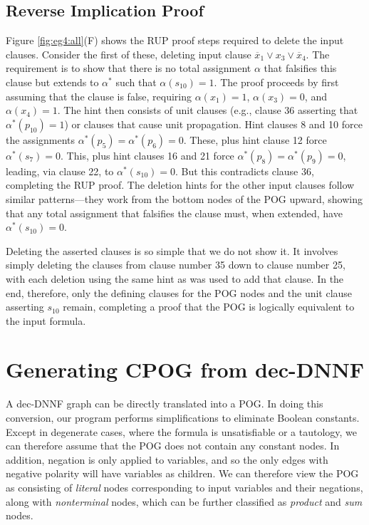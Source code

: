 \documentclass[twoside,11pt]{article}
\newcommand{\obar}[1]{\overline{#1}}
\newcommand{\extend}[1]{#1^{*}}
\newcommand{\assign}{\alpha}
\newcommand{\eassign}{\extend{\alpha}}
\newcommand{\progname}[1]{\textsc{#1}}
\newcommand{\dfour}{\progname{D4}}
\begin{document}
\subsection{Reverse Implication Proof}

Figure \ref{fig:eg4:all}(F) shows the RUP proof steps required to
delete the input clauses.  Consider the first of these, deleting
input clause $\obar{x}_1 \lor x_3 \lor \obar{x}_4$.  The requirement is to show
that there is no total assignment $\assign$ that falsifies this clause but extends to $\eassign$ such that  $\assign(s_{10}) = 1$.
The proof proceeds by first assuming that the clause is false, requiring
$\assign(x_1) = 1$, $\assign(x_3) = 0$, and $\assign(x_4) = 1$.  The hint then consists of unit
clauses (e.g., clause 36 asserting that $\eassign(p_{10}) = 1$) or
clauses that cause unit propagation.  Hint clauses 8 and 10 force the
assignments $\eassign(p_5) = \eassign(p_6) = 0$.  These, plus hint clause 12 force
$\eassign(s_7) = 0$.  This, plus hint clauses 16 and 21 force $\eassign(p_8) = \eassign(p_9) = 0$, leading,
via clause 22, to $\eassign(s_{10}) = 0$.  But this contradicts clause 36,
completing the RUP proof.  The deletion hints for the other input
clauses follow similar patterns---they work from the bottom nodes of
the POG upward, showing that any total assignment that falsifies the clause
must, when extended, have $\eassign(s_{10}) = 0$.

Deleting the asserted clauses is so simple that we do not show it.  It
involves simply deleting the clauses from clause number 35 down to
clause number 25, with each deletion using the same hint as was used
to add that clause.  In the end, therefore, only the defining clauses
for the POG nodes and the unit clause asserting $s_{10}$ remain,
completing a proof that the POG is logically equivalent to the input
formula.

\section{Generating CPOG from dec-DNNF}
\label{section:generating:cpog}

A dec-DNNF
graph can be directly translated  into a POG.
In doing this conversion,
our program performs simplifications to
eliminate Boolean constants.
Except in degenerate cases,
where the formula is unsatisfiable or a tautology,
we can therefore assume
that the POG does not contain any constant nodes.
In addition, negation is only
applied to variables, and so the only edges with negative polarity will have variables as children.
We can therefore
view the POG as consisting
of \emph{literal} nodes corresponding to input variables and their negations, along with
\emph{nonterminal} nodes, which can be further classified as \emph{product} and \emph{sum} nodes.
\end{document}
